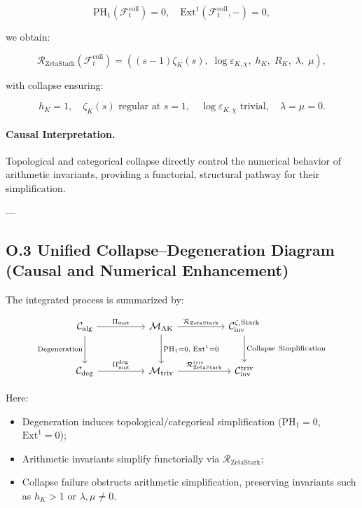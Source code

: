 \documentclass[11pt]{article}
\begin{document}
\[
\mathrm{PH}_1(\mathcal{F}_t^{\mathrm{coll}}) = 0, \quad \mathrm{Ext}^1(\mathcal{F}_t^{\mathrm{coll}}, -) = 0,
\]

we obtain:

\[
\mathcal{R}_{\mathrm{ZetaStark}}(\mathcal{F}_t^{\mathrm{coll}}) =
\left( (s - 1)\zeta_K(s),\; \log \varepsilon_{K,\chi},\; h_K,\; R_K,\; \lambda,\; \mu \right),
\]

with collapse ensuring:

\[
h_K = 1, \quad \zeta_K(s) \text{ regular at } s = 1, \quad \log \varepsilon_{K,\chi} \text{ trivial}, \quad \lambda = \mu = 0.
\]

\paragraph{Causal Interpretation.}
Topological and categorical collapse directly control the numerical behavior of arithmetic invariants, providing a functorial, structural pathway for their simplification.

---

\subsection*{O.3 Unified Collapse–Degeneration Diagram (Causal and Numerical Enhancement)}

The integrated process is summarized by:

\[
\begin{tikzcd}[column sep=huge, row sep=large]
\mathcal{C}_{\mathrm{alg}} \arrow[r, "{\Pi_{\mathrm{mot}}}"] \arrow[d, "{\mathrm{Degeneration}}"']
& \mathcal{M}_{\mathrm{AK}} \arrow[r, "{\mathcal{R}_{\mathrm{ZetaStark}}}"] \arrow[d, "{\mathrm{PH}_1 = 0,\; \mathrm{Ext}^1 = 0}"]
& \mathcal{C}_{\mathrm{inv}}^{\zeta,\mathrm{Stark}} \arrow[d, "{\mathrm{Collapse\ Simplification}}"] \\
\mathcal{C}_{\mathrm{deg}} \arrow[r, "{\Pi_{\mathrm{mot}}^{\mathrm{deg}}}"]
& \mathcal{M}_{\mathrm{triv}} \arrow[r, "{\mathcal{R}_{\mathrm{ZetaStark}}^{\mathrm{triv}}}"]
& \mathcal{C}_{\mathrm{inv}}^{\mathrm{triv}}
\end{tikzcd}
\]

Here:

\begin{itemize}
  \item Degeneration induces topological/categorical simplification (\( \mathrm{PH}_1 = 0 \), \( \mathrm{Ext}^1 = 0 \));
  \item Arithmetic invariants simplify functorially via \( \mathcal{R}_{\mathrm{ZetaStark}} \);
  \item Collapse failure obstructs arithmetic simplification, preserving invariants such as \( h_K > 1 \) or \( \lambda, \mu \neq 0 \).
\end{itemize}
\end{document}
